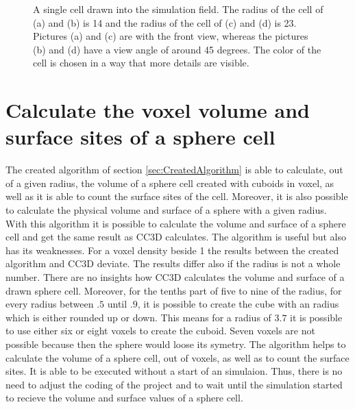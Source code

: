 \begin{figure}[ht]
\begin{center}
{	}
	\end{center}
	\caption[Drawn sphere cells with a radius of 14 and 23]{\label{img:DrawnSphereCellRadius14And23}A single cell drawn into the simulation field. The radius of the cell of (a) and (b) is 14 and the radius of the cell of (c) and (d) is 23. Pictures (a) and (c) are with the front view, whereas the
pictures (b) and (d) have a view angle of around 45 degrees. The color of the cell is chosen in
a way that more details are visible.}
\end{figure}


\section{Calculate the voxel volume and surface sites of a sphere cell}
The created algorithm of section \ref{sec:CreatedAlgorithm} is able to calculate, out of a given radius, the volume of a sphere cell created with cuboids in voxel, as well as it is able to count the surface sites of the cell. Moreover, it is also possible to calculate the physical volume and surface of a sphere with a given radius. With this algorithm it is possible to calculate the volume and surface of a sphere cell and get the same result as \ac{CC3D} calculates. \newline
The algorithm is useful but also has its weaknesses. For a voxel density beside 1 the results between the created algorithm and \ac{CC3D} deviate. The results differ also if the radius is not a whole number. There are no insights how \ac{CC3D} calculates the volume and surface of a drawn sphere cell. Moreover, for the tenths part of five to nine of the radius, for every radius between $.5$ until $.9$, it is possible to create the cube with an radius which is either rounded up or down. This means for a radius of $3.7$ it is possible to use either six or eight voxels to create the cuboid. Seven voxels are not possible because then the sphere would loose its symetry. \newline
The algorithm helps to calculate the volume of a sphere cell, out of voxels, as well as to count the surface sites. It is able to be executed without a start of an simulaion. Thus, there is no need to adjust the coding of the project and to wait until the simulation started to recieve the volume and surface values of a sphere cell. 

